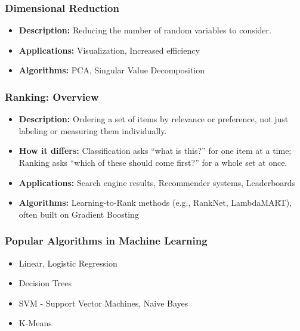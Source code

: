 \begin{frame}[fragile]\frametitle{Dimensional Reduction}
\begin{itemize}
\item \textbf{Description:} Reducing the number of random variables to consider.
\item \textbf{Applications:} Visualization, Increased efficiency
\item \textbf{Algorithms:} PCA, Singular Value Decomposition
\end{itemize}
\end{frame}

\begin{frame}[fragile]\frametitle{Ranking: Overview}
\begin{itemize}
\item \textbf{Description:} Ordering a set of items by relevance or preference, not just labeling or measuring them individually.
\item \textbf{How it differs:} Classification asks ``what is this?'' for one item at a time; Ranking asks ``which of these should come first?'' for a whole set at once.
\item \textbf{Applications:} Search engine results, Recommender systems, Leaderboards
\item \textbf{Algorithms:} Learning-to-Rank methods (e.g., RankNet, LambdaMART), often built on Gradient Boosting
\end{itemize}
\end{frame}

\begin{frame}[fragile]\frametitle{Popular Algorithms in Machine Learning}
	\begin{itemize}
	\item  Linear, Logistic Regression
	\item  Decision Trees
	\item  SVM - Support Vector Machines, Naive Bayes
	\item K-Means
	\end{itemize}
\end{frame}

